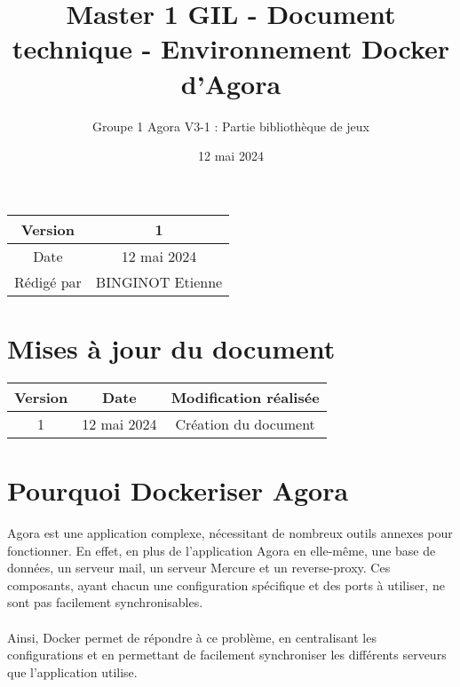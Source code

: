 \documentclass{article}
\title{Master 1 GIL - Document technique - Environnement Docker d'Agora}
\author{Groupe 1 Agora V3-1 : Partie bibliothèque de jeux}
\date{12 mai 2024}
\begin{document}
\maketitle
    \begin{center}
        \begin{tabular}{|| c | c ||}
                \hline 
                Version & 1 \\
                \hline 
                Date & 12 mai 2024 \\
                \hline
                Rédigé par & BINGINOT Etienne\\
                \hline
        \end{tabular}
    \end{center}

    \newpage
    \section*{Mises à jour du document}

    \begin{center}
        \begin{tabular}{|| c | c | c ||}
                \hline 
                Version & Date & Modification réalisée \\
                \hline
                \hline 
                1 & 12 mai 2024 & Création du document \\
                \hline
        \end{tabular}
    \end{center}

    \newpage
    \tableofcontents
    \newpage

    \section{Pourquoi Dockeriser Agora}

        Agora est une application complexe, nécessitant de nombreux outils annexes pour fonctionner. En effet, en plus de l'application Agora en elle-même, une base de données, un serveur mail, un serveur Mercure et un reverse-proxy. Ces composants, ayant chacun une configuration spécifique et des ports à utiliser, ne sont pas facilement synchronisables.\\
        \\
        \indent Ainsi, Docker permet de répondre à ce problème, en centralisant les configurations et en permettant de facilement synchroniser les différents serveurs que l'application utilise.
\end{document}
